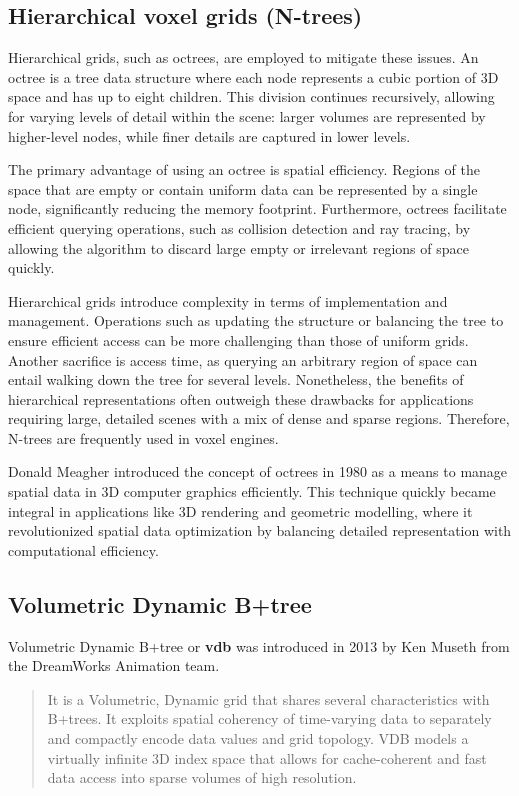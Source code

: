 \subsection{Hierarchical voxel grids (N-trees)}
Hierarchical grids, such as octrees, are employed to mitigate these issues. An octree is a tree data structure where each node represents a cubic portion of 3D space and has up to eight children. This division continues recursively, allowing for varying levels of detail within the scene: larger volumes are represented by higher-level nodes, while finer details are captured in lower levels.

The primary advantage of using an octree is spatial efficiency. Regions of the space that are empty or contain uniform data can be represented by a single node, significantly reducing the memory footprint. Furthermore, octrees facilitate efficient querying operations, such as collision detection and ray tracing, by allowing the algorithm to discard large empty or irrelevant regions of space quickly.

Hierarchical grids introduce complexity in terms of implementation and management. Operations such as updating the structure or balancing the tree to ensure efficient access can be more challenging than those of uniform grids.
Another sacrifice is access time, as querying an arbitrary region of space can entail walking down the tree for several levels.
Nonetheless, the benefits of hierarchical representations often outweigh these drawbacks for applications requiring large, detailed scenes with a mix of dense and sparse regions. Therefore, N-trees are frequently used in voxel engines.

Donald Meagher introduced the concept of octrees in 1980\supercite{donald} as a means to manage spatial data in 3D computer graphics efficiently. This technique quickly became integral in applications like 3D rendering and geometric modelling, where it revolutionized spatial data optimization by balancing detailed representation with computational efficiency.

\subsection{Volumetric Dynamic B+tree}

Volumetric Dynamic B+tree or \textbf{\acrshort{vdb}} was introduced in 2013 by Ken Museth\supercite{vdb2013} from the DreamWorks Animation team.
\begin{quote}
It is a Volumetric, Dynamic grid that shares several characteristics with B+trees.
It exploits spatial coherency of time-varying data to separately and compactly encode data values and grid topology.
VDB models a virtually infinite 3D index space that allows for cache-coherent and fast data access into sparse volumes of high resolution.
\end{quote}

